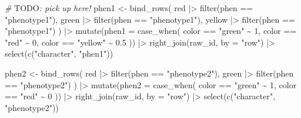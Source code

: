 \documentclass[
]{book}
\newenvironment{Shaded}{\begin{snugshade}}{\end{snugshade}}
\newcommand{\AlertTok}[1]{\textcolor[rgb]{0.94,0.16,0.16}{#1}}
\newcommand{\AttributeTok}[1]{\textcolor[rgb]{0.77,0.63,0.00}{#1}}
\newcommand{\CommentTok}[1]{\textcolor[rgb]{0.56,0.35,0.01}{\textit{#1}}}
\newcommand{\DecValTok}[1]{\textcolor[rgb]{0.00,0.00,0.81}{#1}}
\newcommand{\FloatTok}[1]{\textcolor[rgb]{0.00,0.00,0.81}{#1}}
\newcommand{\FunctionTok}[1]{\textcolor[rgb]{0.00,0.00,0.00}{#1}}
\newcommand{\NormalTok}[1]{#1}
\newcommand{\OtherTok}[1]{\textcolor[rgb]{0.56,0.35,0.01}{#1}}
\newcommand{\SpecialCharTok}[1]{\textcolor[rgb]{0.00,0.00,0.00}{#1}}
\newcommand{\StringTok}[1]{\textcolor[rgb]{0.31,0.60,0.02}{#1}}
\begin{document}
\begin{Shaded}
\begin{Highlighting}[]
\CommentTok{\# }\AlertTok{TODO}\CommentTok{: pick up here! }
\NormalTok{phen1 }\OtherTok{\textless{}{-}} \FunctionTok{bind\_rows}\NormalTok{(}
\NormalTok{  red }\SpecialCharTok{|\textgreater{}} \FunctionTok{filter}\NormalTok{(phen }\SpecialCharTok{==} \StringTok{"phenotype1"}\NormalTok{),}
\NormalTok{  green }\SpecialCharTok{|\textgreater{}} \FunctionTok{filter}\NormalTok{(phen }\SpecialCharTok{==} \StringTok{"phenotype1"}\NormalTok{),}
\NormalTok{  yellow }\SpecialCharTok{|\textgreater{}} \FunctionTok{filter}\NormalTok{(phen }\SpecialCharTok{==} \StringTok{"phenotype1"}\NormalTok{)}
\NormalTok{) }\SpecialCharTok{|\textgreater{}} 
  \FunctionTok{mutate}\NormalTok{(}\AttributeTok{phen1 =} \FunctionTok{case\_when}\NormalTok{(}
\NormalTok{    color }\SpecialCharTok{==} \StringTok{"green"} \SpecialCharTok{\textasciitilde{}} \DecValTok{1}\NormalTok{,}
\NormalTok{    color }\SpecialCharTok{==} \StringTok{"red"} \SpecialCharTok{\textasciitilde{}} \DecValTok{0}\NormalTok{,}
\NormalTok{    color }\SpecialCharTok{==} \StringTok{"yellow"} \SpecialCharTok{\textasciitilde{}} \FloatTok{0.5}
\NormalTok{  )) }\SpecialCharTok{|\textgreater{}} 
  \FunctionTok{right\_join}\NormalTok{(raw\_id, }\AttributeTok{by =} \StringTok{"row"}\NormalTok{) }\SpecialCharTok{|\textgreater{}} 
  \FunctionTok{select}\NormalTok{(}\FunctionTok{c}\NormalTok{(}\StringTok{"character"}\NormalTok{, }\StringTok{"phen1"}\NormalTok{))}


\NormalTok{phen2 }\OtherTok{\textless{}{-}} \FunctionTok{bind\_rows}\NormalTok{(}
\NormalTok{  red }\SpecialCharTok{|\textgreater{}} \FunctionTok{filter}\NormalTok{(phen }\SpecialCharTok{==} \StringTok{"phenotype2"}\NormalTok{),}
\NormalTok{  green }\SpecialCharTok{|\textgreater{}} \FunctionTok{filter}\NormalTok{(phen }\SpecialCharTok{==} \StringTok{"phenotype2"}\NormalTok{)}
\NormalTok{) }\SpecialCharTok{|\textgreater{}} 
  \FunctionTok{mutate}\NormalTok{(}\AttributeTok{phen2 =} \FunctionTok{case\_when}\NormalTok{(}
\NormalTok{    color }\SpecialCharTok{==} \StringTok{"green"} \SpecialCharTok{\textasciitilde{}} \DecValTok{1}\NormalTok{,}
\NormalTok{    color }\SpecialCharTok{==} \StringTok{"red"} \SpecialCharTok{\textasciitilde{}} \DecValTok{0}
\NormalTok{  )) }\SpecialCharTok{|\textgreater{}} 
  \FunctionTok{right\_join}\NormalTok{(raw\_id, }\AttributeTok{by =} \StringTok{"row"}\NormalTok{) }\SpecialCharTok{|\textgreater{}} 
  \FunctionTok{select}\NormalTok{(}\FunctionTok{c}\NormalTok{(}\StringTok{"character"}\NormalTok{, }\StringTok{"phenotype2"}\NormalTok{))}



\end{Highlighting}
\end{Shaded}
\end{document}
